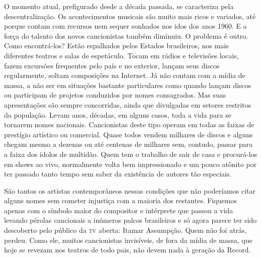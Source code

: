 O momento atual, prefigurado desde a década passada, se caracteriza pela
descentralização. Os acontecimentos musicais são muito mais ricos e
variados, até porque contam com recursos nem sequer sonhados nos idos
dos anos 1960. E a força do talento dos novos cancionistas também
diminuiu. O problema é outro. Como encontrá-los? Estão espalhados pelos
Estados brasileiros, nos mais diferentes teatros e salas de espetáculo.
Tocam em rádios e televisões locais, fazem excursões frequentes pelo
país e no exterior, lançam seus discos regularmente, soltam composições
na Internet. Já não contam com a mídia de massa, a não ser em situações
bastante particulares como quando lançam discos ou participam de
projetos conduzidos por nomes consagrados. Mas suas apresentações são
sempre concorridas, ainda que divulgadas em setores restritos da
população. Levam anos, décadas, em alguns casos, toda a vida para se
tornarem nomes nacionais. Cancionistas deste tipo operam em todas as
faixas de prestígio artístico ou comercial. Quase todos vendem milhares
de discos e alguns chegam mesmo a dezenas ou até centenas de milhares
sem, contudo, passar para a faixa dos ídolos de multidão. Quem tem o
trabalho de sair de casa e procurá-los em shows ao vivo, normalmente
volta bem impressionado e um pouco atônito por ter passado tanto tempo
sem saber da existência de autores tão especiais.

São tantos os artistas contemporâneos nessas condições que não
poderíamos citar alguns nomes sem cometer injustiça com a maioria dos
restantes. Fiquemos apenas com o símbolo maior do compositor e
intérprete que passou a vida levando pérolas cancionais a inúmeros
palcos brasileiros e só agora parece ter sido descoberto pelo público da
\textsc{tv} aberta: Itamar Assumpção. Quem não foi atrás, perdeu. Como ele,
muitos cancionistas invisíveis, de fora da mídia de massa, que hoje se
revezam nos teatros de todo pais, não devem nada à geração da Record.

